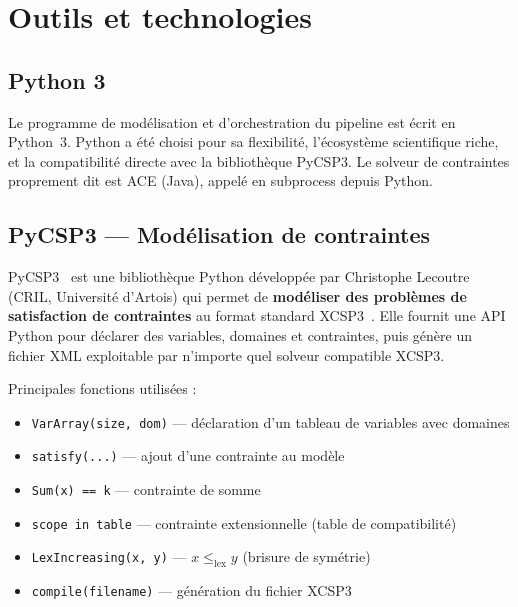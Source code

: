 \section{Outils et technologies}

\subsection{Python 3}

Le programme de modélisation et d'orchestration du pipeline est écrit en Python~3. Python a été
choisi pour sa flexibilité, l'écosystème scientifique riche, et la compatibilité directe avec
la bibliothèque PyCSP3. Le solveur de contraintes proprement dit est ACE (Java), appelé en
subprocess depuis Python.

\subsection{PyCSP3 — Modélisation de contraintes}

\begin{definition}[PyCSP3]
  PyCSP3~\cite{pycsp3} est une bibliothèque Python développée par Christophe Lecoutre (CRIL,
  Université d'Artois) qui permet de \textbf{modéliser des problèmes de satisfaction de
  contraintes} au format standard XCSP3~\cite{xcsp3}. Elle fournit une API Python pour
  déclarer des variables, domaines et contraintes, puis génère un fichier XML exploitable
  par n'importe quel solveur compatible XCSP3.
\end{definition}

Principales fonctions utilisées :
\begin{itemize}
  \item \texttt{VarArray(size, dom)} — déclaration d'un tableau de variables avec domaines
  \item \texttt{satisfy(...)} — ajout d'une contrainte au modèle
  \item \texttt{Sum(x) == k} — contrainte de somme
  \item \texttt{scope in table} — contrainte extensionnelle (table de compatibilité)
  \item \texttt{LexIncreasing(x, y)} — $x \leq_{\text{lex}} y$ (brisure de symétrie)
  \item \texttt{compile(filename)} — génération du fichier XCSP3
\end{itemize}

